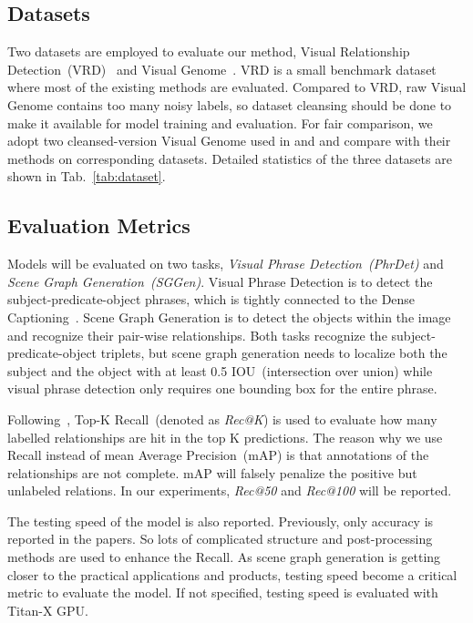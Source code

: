 \documentclass[runningheads]{llncs}
\begin{document}
\subsection{Datasets}

Two datasets are employed to evaluate our method, Visual Relationship Detection~(VRD)~\cite{visual_relationship} and Visual Genome~\cite{visual_genome}. VRD is a small benchmark dataset where most of the existing methods are evaluated. Compared to VRD, raw Visual Genome contains too many noisy labels, so dataset cleansing should be done to make it available for model training and evaluation. For fair comparison, we adopt two cleansed-version Visual Genome used in \cite{li2017scene} and \cite{dai2017detecting} and compare with their methods on corresponding datasets. Detailed statistics of the three datasets are shown in Tab.~\ref{tab:dataset}.

\subsection{Evaluation Metrics}
Models will be evaluated on two tasks, \emph{Visual Phrase Detection~(PhrDet)} and \emph{Scene Graph Generation~(SGGen)}. Visual Phrase Detection is to detect the subject-predicate-object phrases, which is tightly connected to the Dense Captioning~\cite{densecap}. Scene Graph Generation is to detect the objects within the image and recognize their pair-wise relationships. Both tasks recognize the subject-predicate-object triplets, but scene graph generation needs to localize both the subject and the object with at least 0.5 IOU~(intersection over union) while visual phrase detection only requires one bounding box for the entire phrase.  

Following~\cite{visual_relationship}, Top-K Recall~(denoted as \emph{Rec@K}) is used to evaluate how many labelled relationships are hit in the top K predictions. The reason why we use Recall instead of mean Average Precision~(mAP) is that annotations of the relationships are not complete. mAP will falsely penalize the positive but unlabeled relations. In our experiments, \emph{Rec@50} and \emph{Rec@100} will be reported. 


The testing speed of the model is also reported. Previously, only accuracy is reported in the papers. So lots of complicated structure and post-processing methods are used to enhance the Recall. 
As scene graph generation is getting closer to the practical applications and products, testing speed become a critical metric to evaluate the model. If not specified, testing speed is evaluated with Titan-X GPU.
\end{document}
